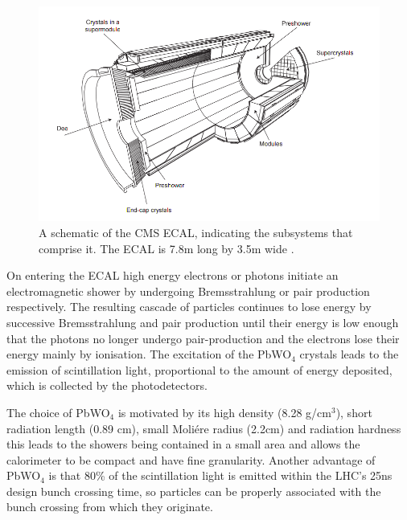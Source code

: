 \begin{figure}
  \includegraphics[width=1.2\largefigwidth]{plots/detector/ecal_layout.png}
  \caption{A schematic of the CMS \ac{ECAL}, indicating the subsystems that comprise it. The \ac{ECAL} is 7.8m long by 3.5m wide \cite{Chatrchyan:2008aa}.}
  \label{fig:ecalschematic}
\end{figure}

 On entering the \ac{ECAL} high energy electrons or photons initiate an electromagnetic shower by undergoing Bremsstrahlung or pair production respectively. The resulting cascade of particles continues to lose energy by successive Bremsstrahlung and pair production until their energy is low enough that the photons no longer undergo pair-production and the electrons lose their energy mainly by ionisation. The excitation of the PbWO$_{4}$ crystals leads to the emission of scintillation light, proportional to the amount of energy deposited, which is collected by the photodetectors.

The choice of PbWO$_{4}$ is motivated by its high density (8.28 g/cm$^{3}$), short radiation length (0.89 cm), small Moli\'{e}re radius (2.2cm) and radiation hardness this leads to the showers being contained in a small area and allows the calorimeter to be compact and have fine granularity. Another advantage of PbWO$_{4}$ is that 80\% of the scintillation light is emitted within the LHC's 25ns design bunch crossing time, so particles can be properly associated with the bunch crossing from which they originate.

